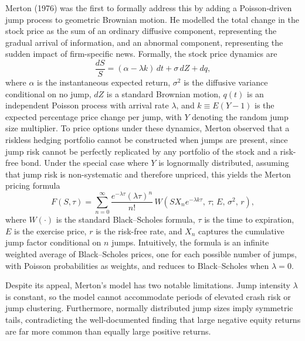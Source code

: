 \documentclass[12pt]{article}
\begin{document}
Merton (1976) was the first to formally address this by adding a Poisson-driven jump process to geometric Brownian motion. He modelled the total change in the stock price as the sum of an ordinary diffusive component, representing the gradual arrival of information, and an abnormal component, representing the sudden impact of firm-specific news. Formally, the stock price dynamics are
\begin{equation}
\frac{dS}{S} = (\alpha - \lambda k)\,dt + \sigma\,dZ + dq,
\end{equation}
where $\alpha$ is the instantaneous expected return, $\sigma^2$ is the diffusive variance conditional on no jump, $dZ$ is a standard Brownian motion, $q(t)$ is an independent Poisson process with arrival rate $\lambda$, and $k \equiv E(Y-1)$ is the expected percentage price change per jump, with $Y$ denoting the random jump size multiplier. To price options under these dynamics, Merton observed that a riskless hedging portfolio cannot be constructed when jumps are present, since jump risk cannot be perfectly replicated by any portfolio of the stock and a risk-free bond. Under the special case where $Y$ is lognormally distributed, assuming that jump risk is non-systematic and therefore unpriced, this yields the Merton pricing formula
\begin{equation}
F(S,\tau) = \sum_{n=0}^{\infty} \frac{e^{-\lambda\tau}(\lambda\tau)^n}{n!}\,W\!\left(S X_n e^{-\lambda k\tau},\,\tau;\,E,\,\sigma^2,\,r\right),
\end{equation}
where $W(\cdot)$ is the standard Black--Scholes formula, $\tau$ is the time to expiration, $E$ is the exercise price, $r$ is the risk-free rate, and $X_n$ captures the cumulative jump factor conditional on $n$ jumps. Intuitively, the formula is an infinite weighted average of Black--Scholes prices, one for each possible number of jumps, with Poisson probabilities as weights, and reduces to Black--Scholes when $\lambda = 0$.

Despite its appeal, Merton's model has two notable limitations. Jump intensity $\lambda$ is constant, so the model cannot accommodate periods of elevated crash risk or jump clustering. Furthermore, normally distributed jump sizes imply symmetric tails, contradicting the well-documented finding that large negative equity returns are far more common than equally large positive returns.
\end{document}
